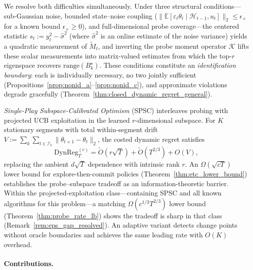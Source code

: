 \documentclass{article}
\newcommand{\E}{\mathbb{E}}
\newcommand{\cH}{\mathcal{H}}
\newcommand{\cI}{\mathcal{I}}
\newcommand{\DynReg}{\mathrm{DynReg}}
\newcommand{\range}{\mathrm{range}}
\begin{document}
  We resolve both difficulties simultaneously. Under three structural
  conditions---sub-Gaussian noise, bounded state--noise coupling
  ($\|\E[\varepsilon_t\theta_t \mid \cH_{t-1}, u_t]\|_2 \le
  \epsilon_\times$ for a known bound $\epsilon_\times \ge 0$), and
  full-dimensional probe coverage---the centered statistic
  $s_t := y_t^2 - \hat\sigma^2$ (where $\hat\sigma^2$ is an online
  estimate of the noise variance) yields a quadratic measurement of
  $\widetilde{M}_t$, and inverting the probe moment operator
  $\mathcal{K}$ lifts these scalar measurements into matrix-valued
  estimates from which the top-$r$ eigenspace recovers
  $\range(B_k^\star)$. These conditions constitute an
  \emph{identification boundary}: each is individually necessary,
  no two jointly sufficient
  (Propositions~\ref{prop:nonid_a}--\ref{prop:nonid_c}), and
  approximate violations degrade gracefully
  (Theorem~\ref{thm:closed_dynamic_regret_general}).

  \emph{Single-Play Subspace-Calibrated Optimism} (SPSC) interleaves probing with
  projected UCB exploitation in the learned $r$-dimensional subspace.
  For $K$ stationary segments with total within-segment drift
  $V := \sum_k \sum_{t \in \cI_k} \|\theta_{t+1} - \theta_t\|_2$,
  the costed dynamic regret satisfies
  \[
  \DynReg_T^{(c)} = \widetilde{O}(r\sqrt{T})
  + \widetilde{O}(T^{2/3}) + O(V),
  \]
  replacing the ambient $d\sqrt{T}$ dependence with intrinsic rank $r$.
  An $\Omega(\sqrt{cT})$ lower bound for explore-then-commit
  policies (Theorem~\ref{thm:etc_lower_bound}) establishes the
  probe--subspace tradeoff as an information-theoretic barrier.
  Within the projected-exploitation class---containing SPSC and all known algorithms for this problem---a matching $\Omega(c^{1/3}T^{2/3})$ lower bound
  (Theorem~\ref{thm:probe_rate_lb}) shows the tradeoff is sharp in that class
  (Remark~\ref{rem:eps_gap_resolved}).
  An adaptive variant detects change points without oracle boundaries
  and achieves the same leading rate with $O(K)$ overhead.

  \paragraph{Contributions.}
\end{document}
